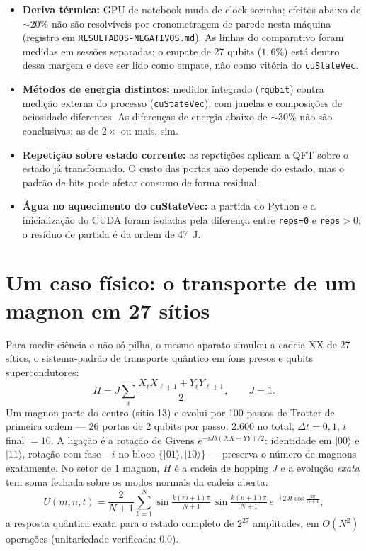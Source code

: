 \documentclass[11pt,a4paper]{article}
\begin{document}
\begin{itemize}
\item \textbf{Deriva térmica:} GPU de notebook muda de clock sozinha; efeitos
  abaixo de $\sim$20\% não são resolvíveis por cronometragem de parede nesta
  máquina (registro em \texttt{RESULTADOS-NEGATIVOS.md}). As linhas do
  comparativo foram medidas em sessões separadas; o empate de 27 qubits
  ($1{,}6\%$) está dentro dessa margem e deve ser lido como empate, não como
  vitória do \texttt{cuStateVec}.
\item \textbf{Métodos de energia distintos:} medidor integrado
  (\texttt{rqubit}) contra medição externa do processo (\texttt{cuStateVec}),
  com janelas e composições de ociosidade diferentes. As diferenças de energia
  abaixo de $\sim$30\% não são conclusivas; as de $2\times$ ou mais, sim.
\item \textbf{Repetição sobre estado corrente:} as repetições aplicam a QFT
  sobre o estado já transformado. O custo das portas não depende do estado,
  mas o padrão de bits pode afetar consumo de forma residual.
\item \textbf{Água no aquecimento do cuStateVec:} a partida do Python e a
  inicialização do CUDA foram isoladas pela diferença entre \texttt{reps=0} e
  \texttt{reps}$>0$; o resíduo de partida é da ordem de 47~J.
\end{itemize}

\section{Um caso físico: o transporte de um magnon em 27 sítios}

Para medir ciência e não só pilha, o mesmo aparato simulou a cadeia XX de 27
sítios, o sistema-padrão de transporte quântico em íons presos e qubits
supercondutores:
\[
H = J \sum_{\ell} \frac{X_\ell X_{\ell+1} + Y_\ell Y_{\ell+1}}{2},
\qquad J = 1.
\]
Um magnon parte do centro (sítio 13) e evolui por 100 passos de Trotter de
primeira ordem --- 26 portas de 2 qubits por passo, 2.600 no total, $\Delta t
= 0{,}1$, $t$ final $= 10$. A ligação é a rotação de Givens
$e^{-iJ\delta(XX+YY)/2}$: identidade em $|00\rangle$ e $|11\rangle$, rotação
com fase $-i$ no bloco $\{|01\rangle,|10\rangle\}$ --- preserva o número de
magnons exatamente. No setor de 1 magnon, $H$ é a cadeia de hopping $J$ e a
evolução \emph{exata} tem soma fechada sobre os modos normais da cadeia
aberta:
\[
U(m,n,t) = \frac{2}{N+1} \sum_{k=1}^{N} \sin\tfrac{k(m+1)\pi}{N+1}\,
\sin\tfrac{k(n+1)\pi}{N+1}\, e^{-i\,2Jt\cos\frac{k\pi}{N+1}},
\]
a resposta quântica exata para o estado completo de $2^{27}$ amplitudes, em
$O(N^2)$ operações (unitariedade verificada: 0,0).
\end{document}
